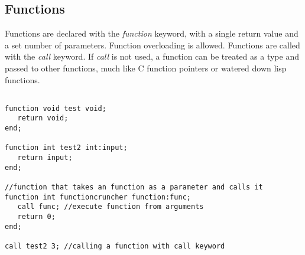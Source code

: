 \documentclass{article}
\begin{document}
\subsection{Functions}
Functions are declared with the \textit{function} keyword, with a single return value and a set number of parameters. Function overloading is allowed. Functions are called with the \textit{call} keyword. If \textit{call} is not used, a function can be treated as a type and passed to other functions, much like C function pointers or watered down lisp functions. 
\begin{verbatim}

function void test void; 
   return void;
end;

function int test2 int:input; 
   return input;
end;

//function that takes an function as a parameter and calls it
function int functioncruncher function:func;
   call func; //execute function from arguments 
   return 0;
end; 

call test2 3; //calling a function with call keyword
\end{verbatim}
\end{document}
